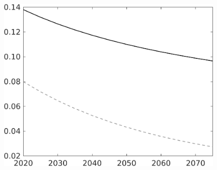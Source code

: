 \documentclass[12pt]{article}
\begin{document}
\begin{figure}[h!!]
\begin{minipage}[]{0.32\textwidth}
	\end{minipage}	
	\begin{minipage}[]{0.32\textwidth}
		\includegraphics[width=1\textwidth]{../../codding_model/own_basedOnFried/optimalPol_010922_revision/figures/all_13Sept22/LevTaufNoTauf_TaulCalib_regime0_pepn_spillover0_nsk1_xgr0_knspil1_sep1_LFlimit0_emsbase0_countec0_GovRev0_etaa0.79_lgd0.png}
	\end{minipage}		
\end{figure}
\end{document}

